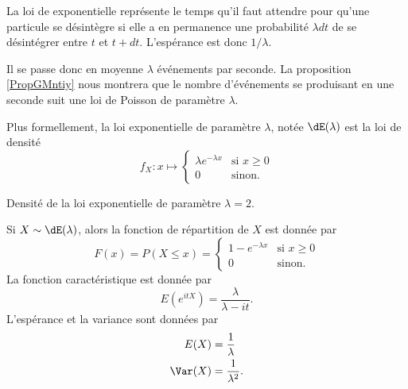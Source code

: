 La loi de exponentielle représente le temps qu'il faut attendre pour qu'une particule se désintègre si elle a en permanence une probabilité \( \lambda dt\) de se désintégrer entre \( t\) et \( t+dt\). L'espérance est donc \( 1/\lambda\).

Il se passe donc en moyenne \( \lambda\) événements par seconde. La proposition \ref{PropGMntiy} nous montrera que le nombre d'événements se produisant en une seconde suit une loi de Poisson de paramètre \( \lambda\).

Plus formellement, la loi exponentielle de paramètre \( \lambda\), notée \( \dE(\lambda)\) est la loi de densité
\begin{equation}
    f_X\colon x\mapsto\begin{cases}
        \lambda e^{-\lambda x}    &   \text{si } x\geq 0\\
        0    &    \text{sinon}.
    \end{cases}
\end{equation}

Densité de la loi exponentielle de paramètre \( \lambda=2\).

\begin{center}
   
\end{center}

\begin{proposition} \label{PropTxGcWn}
    Si \( X\sim\dE(\lambda)\), alors la fonction de répartition de \( X\) est donnée par
    \begin{equation}
        F(x)=P(X\leq x)=\begin{cases}
            1- e^{-\lambda x}    &   \text{si } x\geq 0\\
            0    &    \text{sinon}.
    \end{cases}
    \end{equation}
    La fonction caractéristique est donnée par
    \begin{equation}
        E( e^{itX})=\frac{ \lambda }{ \lambda-it }.
    \end{equation}
    L'espérance et la variance sont données par
    \begin{equation}
        \begin{aligned}[]
            E(X)&=\frac{1}{ \lambda }\\
            \Var(X)&=\frac{1}{ \lambda^2 }.
        \end{aligned}
    \end{equation}
\end{proposition}

